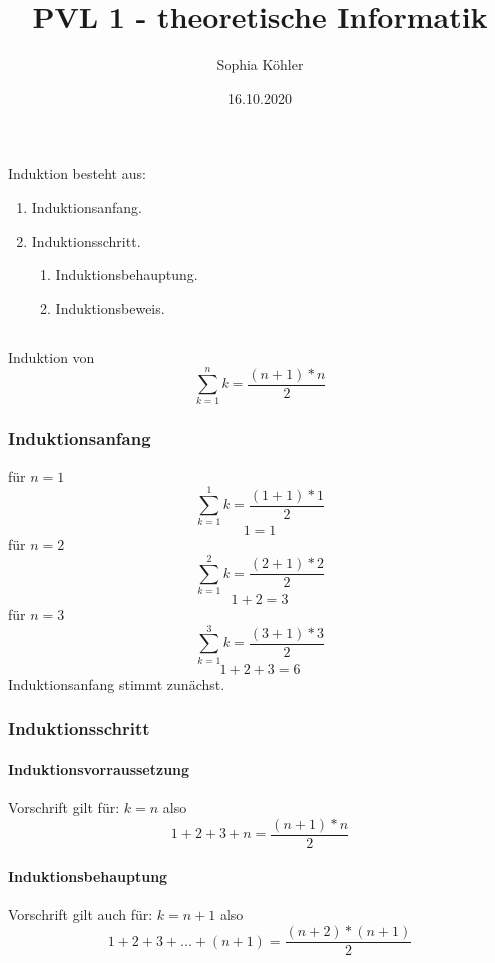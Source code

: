 \documentclass{article}
\title{PVL 1 - theoretische Informatik}
\author{Sophia Köhler}
\date{16.10.2020}
\begin{document}
\maketitle

\section{}
Induktion besteht aus:
\begin{enumerate}
  \item Induktionsanfang.
  \item Induktionsschritt.
  	\begin{enumerate}
	  \item Induktionsbehauptung.
  	\item Induktionsbeweis.
  	\end{enumerate}
\end{enumerate}
\subsection{}
Induktion von \[ \sum_{k=1}^{n}{k} = \frac{(n+1)*n}{2} \]
\subsubsection{Induktionsanfang}

für $n=1$
\[ \sum_{k=1}^{1}{k} = \frac{(1+1)*1}{2} \]
\[ 1 = 1 \]
\newline
für $n=2$
\[ \sum_{k=1}^{2}{k} = \frac{(2+1)*2}{2} \]
\[ 1+2 = 3 \]
\newline
\clearpage
für $n=3$
\[ \sum_{k=1}^{3}{k} = \frac{(3+1)*3}{2} \]
\[ 1+2+3 = 6 \]
\newline
Induktionsanfang stimmt zunächst.
\subsubsection{Induktionsschritt}
\paragraph{Induktionsvorraussetzung}\mbox{}

Vorschrift gilt für: $k=n$ also \[1+2+3+n = \frac{(n+1)*n}{2} \]

\paragraph{Induktionsbehauptung}\mbox{}

Vorschrift gilt auch für: $k=n+1$ also \[1+2+3+...+(n+1) = \frac{(n+2)*(n+1)}{2} \]
\end{document}
